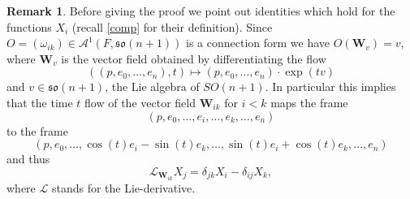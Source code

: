 \documentclass[11pt,letterpaper]{amsart}
\theoremstyle{definition}
\newtheorem*{remark}{Remark}
\numberwithin{equation}{section}
\begin{document}
\begin{remark}
Before giving the proof we point out identities which hold for the functions $X_i$ (recall \eqref{comp} for their definition). Since $O=(\omega_{ik}) \in \mathcal{A}^1(F,\mathfrak{so}(n+1))$ is a connection form we have $O({\mathbf{W}}_v)=v$, where ${\mathbf{W}}_v$ is the vector field obtained by differentiating the flow 
$$
\left((p,e_0,\ldots,e_n),t\right) \mapsto (p,e_0,\ldots,e_n) \cdot \exp(tv)
$$ 
and $v \in \mathfrak{so}(n+1)$, the Lie algebra of $SO(n+1)$. In particular this implies that the time $t$ flow of the vector field ${\mathbf{W}}_{ik}$ for $i<k$ maps the frame 
$$
(p,e_0,\ldots,e_i,\ldots,e_k,\ldots,e_n)
$$ to the frame
$$
\left(p,e_0,\ldots,\cos (t) e_i-\sin (t)e_k,\ldots, \sin (t)e_i+\cos (t)e_k,\ldots, e_n\right)
$$ 
and thus 
\begin{equation}\label{id}
\mathcal{L}_{{\mathbf{W}}_{ik}}X_j=\delta_{jk}X_i-\delta_{ij}X_k, 
\end{equation}
where $\mathcal{L}$ stands for the Lie-derivative. 
\end{remark}
\end{document}
